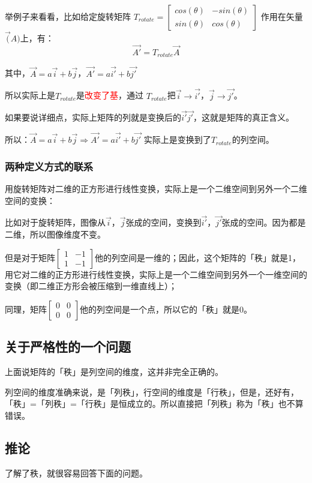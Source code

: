 \documentclass[12pt]{article}
\begin{document}
举例子来看看，比如给定旋转矩阵 $T_{rotate}=\begin{bmatrix}cos(\theta)&-sin(\theta)\\sin(\theta)&cos(\theta)\end{bmatrix}$ 作用在矢量 $\vec(A)$上，有：
$$
\vec{A'} = T_{rotate}\vec{A}
$$

其中，$\vec{A} = a\vec{i} + b\vec{j}$，$\vec{A'} = a\vec{i'} + b\vec{j'}$

所以实际上是$T_{rotate}$是\textcolor{red}{改变了基}，通过 $T_{rotate}$把$\vec{i} \rightarrow \vec{i'}$，$\vec{j} \rightarrow \vec{j'}$。

如果要说详细点，实际上矩阵的列就是变换后的$\vec{i'} \vec{j'}$，这就是矩阵的真正含义。

所以：$\vec{A} = a\vec{i} + b\vec{j} \Rightarrow \vec{A'} = a\vec{i'} + b\vec{j'}$ 实际上是变换到了$T_{rotate}$的列空间。

\subsubsection{两种定义方式的联系}
用旋转矩阵对二维的正方形进行线性变换，实际上是一个二维空间到另外一个二维空间的变换：

比如对于旋转矩阵，图像从$\vec{i}$，$\vec{j}$张成的空间，变换到$\vec{i'}$，$\vec{j'}$张成的空间。因为都是二维，所以图像维度不变。

但是对于矩阵$\begin{bmatrix}1&-1\\1&-1\end{bmatrix}$他的列空间是一维的；因此，这个矩阵的「秩」就是1，用它对二维的正方形进行线性变换，实际上是一个二维空间到另外一个一维空间的变换（即二维正方形会被压缩到一维直线上）；

同理，矩阵$\begin{bmatrix}0&0\\0&0\end{bmatrix}$他的列空间是一个点，所以它的「秩」就是0。

\subsection{关于严格性的一个问题}
上面说矩阵的「秩」是列空间的维度，这并非完全正确的。

列空间的维度准确来说，是「列秩」，行空间的维度是「行秩」，但是，还好有，「秩」=「列秩」=「行秩」是恒成立的。所以直接把「列秩」称为「秩」也不算错误。

\subsection{推论}
了解了秩，就很容易回答下面的问题。
\end{document}
